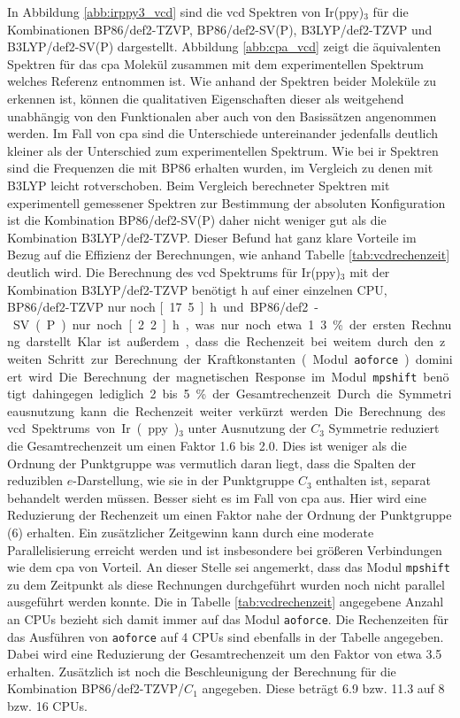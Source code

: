In Abbildung \ref{abb:irppy3_vcd} sind die \ac{vcd} Spektren von Ir(ppy)$_3$ für die Kombinationen BP86/def2-TZVP, BP86/def2-SV(P), B3LYP/def2-TZVP und B3LYP/def2-SV(P) dargestellt. Abbildung \ref{abb:cpa_vcd} zeigt die äquivalenten Spektren für das \ac{cpa} Molekül zusammen mit dem experimentellen Spektrum welches Referenz \cite{brotin2006vibrational} entnommen ist. Wie anhand der Spektren beider Moleküle zu erkennen ist, können die qualitativen Eigenschaften dieser als weitgehend unabhängig von den Funktionalen aber auch von den Basissätzen angenommen werden. Im Fall von \ac{cpa} sind die Unterschiede untereinander jedenfalls deutlich kleiner als der Unterschied zum experimentellen Spektrum. Wie bei \ac{ir} Spektren sind die Frequenzen die mit BP86 erhalten wurden, im Vergleich zu denen mit B3LYP leicht rotverschoben. Beim Vergleich berechneter Spektren mit experimentell gemessener Spektren zur Bestimmung der absoluten Konfiguration ist die Kombination BP86/def2-SV(P) daher nicht weniger gut als die Kombination B3LYP/def2-TZVP. Dieser Befund hat ganz klare Vorteile im Bezug auf die Effizienz der Berechnungen, wie anhand Tabelle \ref{tab:vcdrechenzeit} deutlich wird. Die Berechnung des \ac{vcd} Spektrums für Ir(ppy)$_3$ mit der Kombination B3LYP/def2-TZVP benötigt \unit[166]{h} auf einer einzelnen CPU, BP86/def2-TZVP nur noch \unit[17.5]{h} und BP86/def2-SV(P) nur noch \unit[2.2]{h}, was nur noch etwa 1.3 \% der ersten Rechnung darstellt. Klar ist außerdem, dass die Rechenzeit bei weitem durch den zweiten Schritt zur Berechnung der Kraftkonstanten (Modul \texttt{aoforce}) dominiert wird. Die Berechnung der magnetischen Response im Modul \texttt{mpshift} benötigt dahingegen lediglich 2 bis 5 \% der Gesamtrechenzeit. 

Durch die Symmetrieausnutzung kann die Rechenzeit weiter verkürzt werden. Die Berechnung des \ac{vcd} Spektrums von Ir(ppy)$_3$ unter Ausnutzung der $C_3$ Symmetrie reduziert die Gesamtrechenzeit um einen Faktor 1.6 bis 2.0. Dies ist weniger als die Ordnung der Punktgruppe was vermutlich daran liegt, dass die Spalten der reduziblen $e$-Darstellung, wie sie in der Punktgruppe $C_3$ enthalten ist, separat behandelt werden müssen. Besser sieht es im Fall von \ac{cpa} aus. Hier wird eine Reduzierung der Rechenzeit um einen Faktor nahe der Ordnung der Punktgruppe (6) erhalten. Ein zusätzlicher Zeitgewinn kann durch eine moderate Parallelisierung erreicht werden und ist insbesondere bei größeren Verbindungen wie dem \ac{cpa} von Vorteil. An dieser Stelle sei angemerkt, dass das Modul \texttt{mpshift} zu dem Zeitpunkt als diese Rechnungen durchgeführt wurden noch nicht parallel ausgeführt werden konnte. Die in Tabelle \ref{tab:vcdrechenzeit} angegebene Anzahl an CPUs bezieht sich damit immer auf das Modul \texttt{aoforce}. Die Rechenzeiten für das Ausführen von \texttt{aoforce} auf 4 CPUs sind ebenfalls in der Tabelle angegeben. Dabei wird eine Reduzierung der Gesamtrechenzeit um den Faktor von etwa 3.5 erhalten. Zusätzlich ist noch die Beschleunigung der Berechnung für die Kombination BP86/def2-TZVP/$C_1$ angegeben. Diese beträgt 6.9 bzw. 11.3 auf 8 bzw. 16 CPUs.

